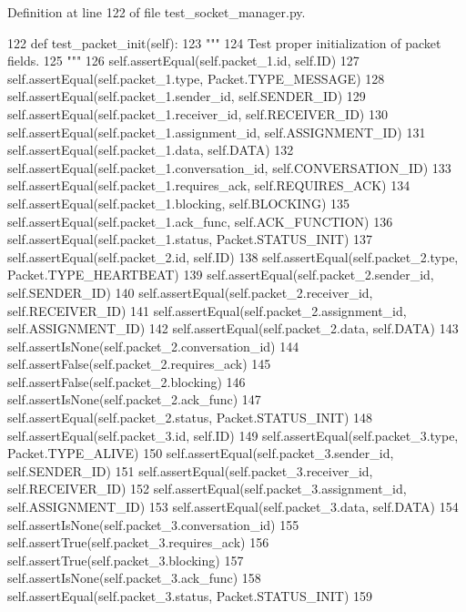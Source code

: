 Definition at line 122 of file test\+\_\+socket\+\_\+manager.\+py.


\begin{DoxyCode}
122     \textcolor{keyword}{def }test\_packet\_init(self):
123         \textcolor{stringliteral}{"""}
124 \textcolor{stringliteral}{        Test proper initialization of packet fields.}
125 \textcolor{stringliteral}{        """}
126         self.assertEqual(self.packet\_1.id, self.ID)
127         self.assertEqual(self.packet\_1.type, Packet.TYPE\_MESSAGE)
128         self.assertEqual(self.packet\_1.sender\_id, self.SENDER\_ID)
129         self.assertEqual(self.packet\_1.receiver\_id, self.RECEIVER\_ID)
130         self.assertEqual(self.packet\_1.assignment\_id, self.ASSIGNMENT\_ID)
131         self.assertEqual(self.packet\_1.data, self.DATA)
132         self.assertEqual(self.packet\_1.conversation\_id, self.CONVERSATION\_ID)
133         self.assertEqual(self.packet\_1.requires\_ack, self.REQUIRES\_ACK)
134         self.assertEqual(self.packet\_1.blocking, self.BLOCKING)
135         self.assertEqual(self.packet\_1.ack\_func, self.ACK\_FUNCTION)
136         self.assertEqual(self.packet\_1.status, Packet.STATUS\_INIT)
137         self.assertEqual(self.packet\_2.id, self.ID)
138         self.assertEqual(self.packet\_2.type, Packet.TYPE\_HEARTBEAT)
139         self.assertEqual(self.packet\_2.sender\_id, self.SENDER\_ID)
140         self.assertEqual(self.packet\_2.receiver\_id, self.RECEIVER\_ID)
141         self.assertEqual(self.packet\_2.assignment\_id, self.ASSIGNMENT\_ID)
142         self.assertEqual(self.packet\_2.data, self.DATA)
143         self.assertIsNone(self.packet\_2.conversation\_id)
144         self.assertFalse(self.packet\_2.requires\_ack)
145         self.assertFalse(self.packet\_2.blocking)
146         self.assertIsNone(self.packet\_2.ack\_func)
147         self.assertEqual(self.packet\_2.status, Packet.STATUS\_INIT)
148         self.assertEqual(self.packet\_3.id, self.ID)
149         self.assertEqual(self.packet\_3.type, Packet.TYPE\_ALIVE)
150         self.assertEqual(self.packet\_3.sender\_id, self.SENDER\_ID)
151         self.assertEqual(self.packet\_3.receiver\_id, self.RECEIVER\_ID)
152         self.assertEqual(self.packet\_3.assignment\_id, self.ASSIGNMENT\_ID)
153         self.assertEqual(self.packet\_3.data, self.DATA)
154         self.assertIsNone(self.packet\_3.conversation\_id)
155         self.assertTrue(self.packet\_3.requires\_ack)
156         self.assertTrue(self.packet\_3.blocking)
157         self.assertIsNone(self.packet\_3.ack\_func)
158         self.assertEqual(self.packet\_3.status, Packet.STATUS\_INIT)
159 
\end{DoxyCode}
